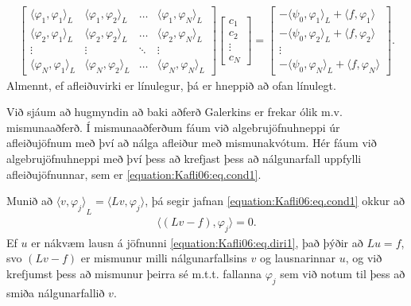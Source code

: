 \documentclass[a4paper,10pt,icelandic]{sphinxmanual}
\begin{document}
\begin{equation}\label{equation:Kafli06:eq.matrixG1d}
\begin{split}\begin{bmatrix}
\langle \varphi_1, \varphi_1\rangle_L & \langle \varphi_1, \varphi_2\rangle_L & \dots &\langle \varphi_1, \varphi_N\rangle_L \\
\langle \varphi_2, \varphi_1\rangle_L & \langle \varphi_2, \varphi_2\rangle_L & \dots &\langle \varphi_2, \varphi_N\rangle_L \\
\vdots & \vdots &\ddots &\vdots \\
\langle \varphi_N, \varphi_1\rangle_L & \langle \varphi_N, \varphi_2\rangle_L & \dots & \langle \varphi_N, \varphi_N\rangle_L
\end{bmatrix}
\begin{bmatrix}
c_1 \\ c_2 \\ \vdots \\c_N
\end{bmatrix} =
\begin{bmatrix}
-\langle \psi_0, \varphi_1\rangle_L +\langle f, \varphi_1\rangle \\
-\langle \psi_0, \varphi_2\rangle_L +\langle  f, \varphi_2\rangle\\ \vdots \\ -\langle \psi_0, \varphi_N\rangle_L +\langle  f,\varphi_N\rangle
\end{bmatrix}.\end{split}
\end{equation}
Almennt, ef afleiðuvirki er línulegur, þá er hneppið að ofan línulegt.


Við sjáum að hugmyndin að baki aðferð Galerkins er frekar ólik m.v. mismunaaðferð.
Í mismunaaðferðum fáum við algebrujöfnuhneppi úr afleiðujöfnum með því að nálga afleiður með mismunakvótum.
Hér fáum við algebrujöfnuhneppi með því þess að krefjast þess að nálgunarfall uppfylli  afleiðujöfnunnar, sem er \eqref{equation:Kafli06:eq.cond1}.

Munið að \({{\langle v,\varphi_j\rangle}}_L=\langle L v, \varphi_j\rangle\), þá segir jafnan \eqref{equation:Kafli06:eq.cond1} okkur að
\begin{equation*}
\begin{split}{{\langle (L v-f),\varphi_j\rangle}}=0.\end{split}
\end{equation*}
Ef \(u\) er nákvæm lausn á jöfnunni \eqref{equation:Kafli06:eq.diri1}, það þýðir að \(Lu=f\), svo \((L v-f)\) er mismunur milli nálgunarfallsins \(v\) og lausnarinnar \(u\), og við krefjumst þess að mismunur þeirra sé   m.t.t. fallanna \(\varphi_j\) sem við notum til þess að smiða nálgunarfallið \(v\).
\end{document}
